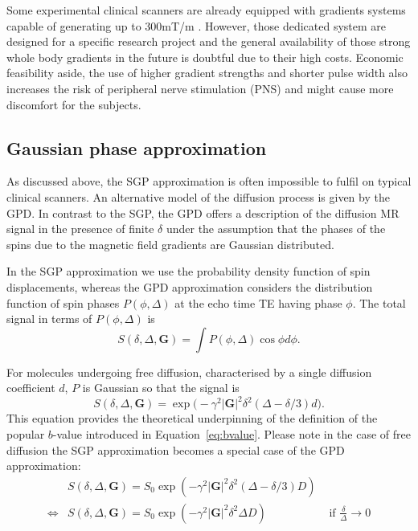Some experimental clinical scanners are already equipped with gradients systems capable of generating up to 300mT/m \citep{Toga:2012}. However, those dedicated system are designed for a specific research project and the general availability of those strong whole body gradients in the future is doubtful due to their high costs. Economic feasibility aside, the use of higher gradient strengths and shorter pulse width also increases the risk of peripheral nerve stimulation (PNS) and might cause more discomfort for the subjects. 

\subsection{Gaussian phase approximation}
\label{sec:chapter 2GPD}
As discussed above, the SGP approximation is often impossible to fulfil on typical clinical scanners. An alternative model of the diffusion process is given by the \gls{GPD}. In contrast to the \gls{SGP}, the \gls{GPD} offers a description of the diffusion MR signal in the presence of finite $\delta$ under the assumption that the phases of the spins due to the magnetic field gradients are Gaussian distributed.

In the SGP approximation we use the probability density function of spin displacements, whereas the GPD approximation considers the distribution function of spin phases $P(\phi,\Delta)$ at the echo time TE  having phase $\phi$. The total signal in terms of $P(\phi,\Delta)$ is
\begin{equation}
S(\delta,\Delta,\textbf{G})  = \int P(\phi,\Delta)\cos\phi d\phi.
\end{equation}

For molecules undergoing free diffusion, characterised by a single diffusion coefficient $d$,  $P$ is Gaussian so that the signal is
\begin{equation}
S(\delta,\Delta,\textbf{G})  =  \exp\Big(- \gamma^{2} |\textbf{G}|^{2} \delta^{2} (\Delta - \delta/3) d\Big).
\label{freediff}
\end{equation}
This equation provides the theoretical underpinning of the definition of the popular $b$-value introduced in Equation~\ref{eq:bvalue}. Please note in the case of free diffusion the SGP approximation becomes a special case of the \gls{GPD} approximation:
\begin{align}
				   & S(\delta,\Delta,\textbf{G})   =  S_0\exp(-\gamma^{2} |\textbf{G}|^{2} \delta^{2} (\Delta - \delta/3) D) & \\ 
\Leftrightarrow & S(\delta,\Delta,\textbf{G})   =  S_0\exp(-\gamma^{2} |\textbf{G}|^{2} \delta^{2} \Delta D)	& \mbox{ if }\frac{\delta}{\Delta}\to 0 
\label{eq: chapter2 GPD vs SGP free diff}
\end{align}
